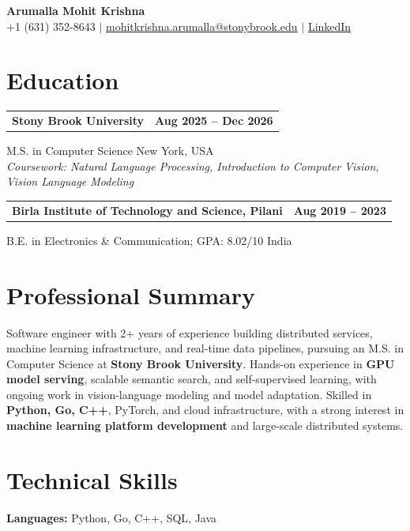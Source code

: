 \documentclass[letterpaper,10pt]{article}
\makeatletter
\newcommand{\entry}[2]{%
  \noindent
  \begin{tabularx}{\linewidth}
    {@{}>{\raggedright\arraybackslash}X@{\hspace{6pt}}r@{}}
    \textbf{#1} & #2
  \end{tabularx}\par
}
\makeatother
\begin{document}
\begin{center}
    {\LARGE\bfseries Arumalla Mohit Krishna}\\[3pt]
    +1 (631) 352-8643 $|$
    \href{mailto:mohitkrishna.arumalla@stonybrook.edu}
    {mohitkrishna.arumalla@stonybrook.edu} $|$
    \href{https://linkedin.com/in/mohit-krishna-arumalla}
    {LinkedIn}
\end{center}
\vspace{-8pt}

\section{Education}

\entry
  {\textbf{Stony Brook University}}
  {\textbf{Aug 2025 -- Dec 2026}}

M.S. in Computer Science \hfill New York, USA\\
\textit{
Coursework: Natural Language Processing,
Introduction to Computer Vision, Vision Language Modeling
}
\vspace{3pt}

\entry
  {\textbf{Birla Institute of Technology and Science, Pilani}}
  {\textbf{Aug 2019 -- 2023}}

B.E. in Electronics \& Communication; GPA: 8.02/10 \hfill India
\section{Professional Summary}

Software engineer with 2+ years of experience building distributed services,
machine learning infrastructure, and real-time data pipelines, pursuing an M.S. in Computer
Science at \textbf{Stony Brook University}. Hands-on experience in \textbf{GPU model serving}, scalable semantic search,
and self-supervised learning, with ongoing work in vision-language modeling and model adaptation. Skilled in
\textbf{Python, Go, C++}, PyTorch, and cloud infrastructure, with a strong interest in \textbf{machine learning platform development} and large-scale distributed systems.

\section{Technical Skills}

\textbf{Languages:}
Python, Go, C++, SQL, Java\\
\end{document}
